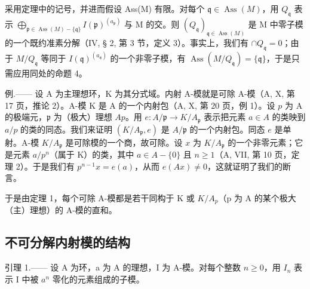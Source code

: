 采用定理中的记号，并进而假设 Ass(M) 有限。对每个 \(\mathfrak{q} \in \operatorname{Ass}(M)\)，用 \(Q_{\mathfrak{q}}\) 表示 \(\bigoplus_{\mathfrak{p} \in \operatorname{Ass}(M) - \{\mathfrak{q}\}} I(\mathfrak{p})^{(a_{\mathfrak{p}})}\) 与 M 的交。则 \((Q_{\mathfrak{q}})_{\mathfrak{q} \in \operatorname{Ass}(M)}\) 是 M 中零子模的一个既约准素分解（IV, § 2, 第 3 节，定义 3）。事实上，我们有 \(\cap Q_{\mathfrak{q}} = 0\)；由于 \(M/Q_{\mathfrak{q}}\) 等同于 \(I(\mathfrak{q})^{(a_{\mathfrak{q}})}\) 的一个非零子模，有 \(\operatorname{Ass}(M/Q_{\mathfrak{q}}) = \{\mathfrak{q}\}\)，于是只需应用同处的命题 4。

例.—— 设 A 为主理想环，K 为其分式域。内射 A-模就是可除 A-模（A, X, 第 17 页，推论 2）。A-模 K 是 A 的一个内射包（A, X, 第 20 页，例 1）。设 \(p\) 为 A 的极端元，\(\mathfrak{p}\) 为（极大）理想 \(Ap\)。用 \(e: A/\mathfrak{p} \longrightarrow K/A_{\mathfrak{p}}\) 表示把元素 \(a \in A\) 的类映到 \(a/p\) 的类的同态。我们来证明 \((K/A_{\mathfrak{p}}, e)\) 是 \(A/\mathfrak{p}\) 的一个内射包。同态 \(e\) 是单射。A-模 \(K/A_{\mathfrak{p}}\) 是可除模的一个商，故可除。设 \(x\) 为 \(K/A_{\mathfrak{p}}\) 的一个非零元素；它是元素 \(a/p^n\)（属于 K）的类，其中 \(a \in A - \{0\}\) 且 \(n \geqslant 1\)（A, VII, 第 10 页，定理 2）。于是我们有 \(p^{n-1}x = e(a)\)，从而 \(e(Ax) \neq 0\)，这就证明了我们的断言。

于是由定理 1，每个可除 A-模都是若干同构于 K 或 \(K/A_{p}\)（p 为 A 的某个极大（主）理想）的 A-模的直和。

\subsection{不可分解内射模的结构}

引理 1.—— 设 A 为环，a 为 A 的理想，I 为 A-模。对每个整数 \(n \geqslant 0\)，用 \(I_{n}\) 表示 I 中被 \(a^{n}\) 零化的元素组成的子模。

